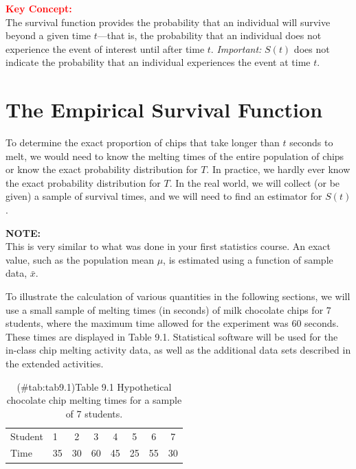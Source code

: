 \documentclass[
]{report}
\begin{document}
\large

\textbf{\textcolor{red}{Key Concept:}}\\
\color{red}
The survival function provides the probability that an individual will survive beyond a given time \(t\)---that is, the probability that an individual does not experience the event of interest until after time \(t\). \emph{Important:} \(S(t)\) does not indicate the probability that an individual experiences the event at time \(t\).\\
\color{black}
\normalsize

\section*{The Empirical Survival Function}\label{the-empirical-survival-function}

To determine the exact proportion of chips that take longer than \(t\) seconds to melt, we would need to know the melting times of the entire population of chips or know the exact probability distribution for \(T\). In practice, we hardly ever know the exact probability distribution for \(T\). In the real world, we will collect (or be given) a sample of survival times, and we will need to find an estimator for \(S(t)\).

\large

\textbf{NOTE:}\\
This is very similar to what was done in your first statistics course. An exact value, such as the population mean \(\mu\), is estimated using a function of sample data, \(\bar x\).\\
\normalsize

To illustrate the calculation of various quantities in the following sections, we will use a small sample
of melting times (in seconds) of milk chocolate chips for 7 students, where the maximum time allowed for
the experiment was 60 seconds. These times are displayed in Table 9.1. Statistical software will be used
for the in-class chip melting activity data, as well as the additional data sets described in the extended
activities.

\begin{table}[!h]
\centering
\caption{(\#tab:tab9.1)Table 9.1 Hypothetical chocolate chip melting times for a sample of 7 students.}
\centering
\begin{tabular}[t]{llcccccc}
\toprule
  &  &  &  &  &  &  & \\
\midrule
Student & 1 & 2 & 3 & 4 & 5 & 6 & 7\\
Time & 35 & 30 & 60 & 45 & 25 & 55 & 30\\
\bottomrule
\end{tabular}
\end{table}
\end{document}
